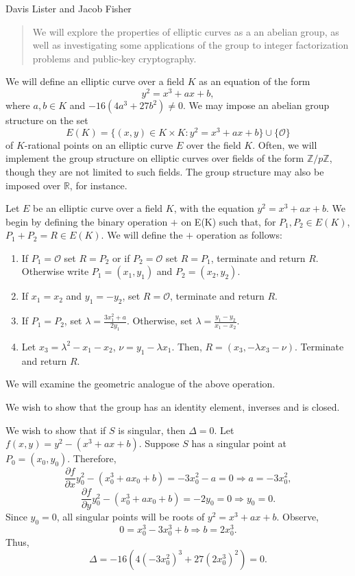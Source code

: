 \documentclass{article}
\begin{document}
Davis Lister and Jacob Fisher

\begin{abstract}
We will explore the properties of elliptic curves as a an abelian group, as well as investigating some applications of the group to integer factorization problems and public-key cryptography.
\end{abstract}

We will define an elliptic curve over a field $K$ as an equation of the form 
$$y^2=x^3+ax+b,$$ 
where $a,b \in K$ and $-16(4a^3+27b^2) \neq 0$. We may impose an abelian group structure on the set
$$E(K)=\lbrace(x,y) \in K \times K: y^2=x^3+ax+b\rbrace \cup \lbrace \mathcal{O} \rbrace$$
of $K$-rational points on an elliptic curve $E$ over the field $K$. Often, we will implement the group structure on elliptic curves over fields of the form $\mathbb{Z}/p\mathbb{Z}$, though they are not limited to such fields. The group structure may also be imposed over $\mathbb{R}$, for instance.

\indent Let $E$ be an elliptic curve over a field $K$, with the equation $y^2=x^3+ax+b$. We begin by defining the binary operation $+$ on E(K) such that, for $P_1,P_2 \in E(K)$, $P_1 + P_2=R \in E(K)$.  We will define the $+$ operation as follows:

\begin{enumerate}
\item If $P_1=\mathcal{O}$ set $R=P_2$ or if $P_2=\mathcal{O}$ set $R=P_1$, terminate and return $R$. Otherwise write $P_1=(x_1,y_1)$ and $P_2=(x_2,y_2)$.
\item If $x_1=x_2$ and $y_1=-y_2$, set $R=\mathcal{O}$, terminate and return $R$.
\item If $P_1=P_2$, set $\lambda=\frac{3x_1^2+a}{2y_1}$. Otherwise, set $\lambda=\frac{y_1-y_2}{x_1-x_2}$.
\item Let $x_3=\lambda^2-x_1-x_2$, $\nu=y_1-\lambda x_1$. Then, $R=(x_3,-\lambda x_3-\nu)$. Terminate and return $R$.
\end{enumerate} 

\indent We will examine the geometric analogue of the above operation.

\indent We wish to show that the group has an identity element, inverses and is closed.

\indent We wish to show that if $S$ is singular, then $\Delta=0$.
Let $f(x,y)=y^2-(x^3+ax+b)$. Suppose $S$ has a singular point at $P_0=(x_0, y_0)$. Therefore,
$$\frac{\partial f}{\partial x} y_0^2-(x_0^3+ax_0+b)=-3x_0^2-a=0 \Longrightarrow a=-3x_0^2,$$
$$\frac{\partial f}{\partial y} y_0^2-(x_0^3+ax_0+b)=-2y_0=0 \Longrightarrow y_0=0.$$
Since $y_0=0$, all singular points will be roots of $y^2=x^3+ax+b$. Observe,
$$0=x_0^3-3x_0^3+b \Longrightarrow b=2x_0^3.$$
Thus,
$$\Delta=-16(4(-3x_0^2)^3+27(2x_0^3)^2)=0.$$
\end{document}

